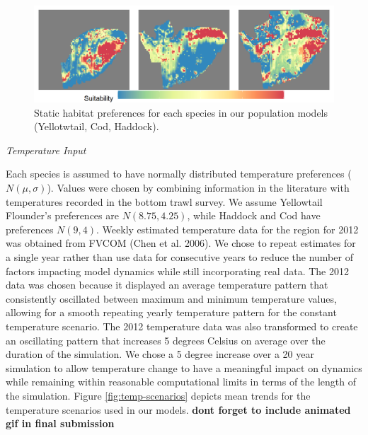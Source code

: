 \documentclass[
  12pt,
]{article}
\begin{document}
\begin{figure}

{\centering \includegraphics[width=0.95\linewidth]{Images/Habitat_3species} 

}

\caption{Static habitat preferences for each species in our population models (Yellotwtail, Cod, Haddock).}\label{fig:hab-plot}
\end{figure}

\emph{Temperature Input}

Each species is assumed to have normally distributed temperature preferences (\(N(\mu,\sigma)\)). Values were chosen by combining information in the literature with temperatures recorded in the bottom trawl survey. We assume Yellowtail Flounder's preferences are \(N(8.75,4.25)\), while Haddock and Cod have preferences \(N(9,4)\). Weekly estimated temperature data for the region for 2012 was obtained from FVCOM (Chen et al. 2006). We chose to repeat estimates for a single year rather than use data for consecutive years to reduce the number of factors impacting model dynamics while still incorporating real data. The 2012 data was chosen because it displayed an average temperature pattern that consistently oscillated between maximum and minimum temperature values, allowing for a smooth repeating yearly temperature pattern for the constant temperature scenario. The 2012 temperature data was also transformed to create an oscillating pattern that increases 5 degrees Celsius on average over the duration of the simulation. We chose a 5 degree increase over a 20 year simulation to allow temperature change to have a meaningful impact on dynamics while remaining within reasonable computational limits in terms of the length of the simulation. Figure \ref{fig:temp-scenarios} depicts mean trends for the temperature scenarios used in our models. \textbf{dont forget to include animated gif in final submission}
\end{document}
